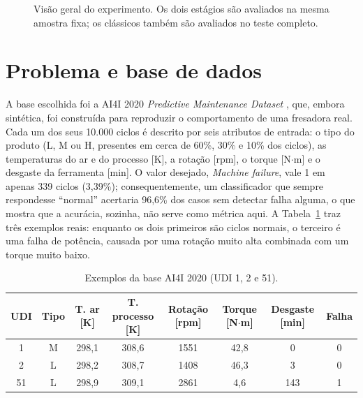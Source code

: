 \documentclass[12pt]{article}
\begin{document}
\begin{figure}[ht]
\caption{Visão geral do experimento. Os dois estágios são avaliados na mesma amostra fixa; os clássicos também são avaliados no teste completo.}
\label{fig:pipeline}
\end{figure}

\section{Problema e base de dados}\label{sec:base}

A base escolhida foi a AI4I 2020 \textit{Predictive Maintenance Dataset} \cite{matzka2020,matzka2020uci}, que, embora sintética, foi construída para reproduzir o comportamento de uma fresadora real. Cada um dos seus 10.000 ciclos é descrito por seis atributos de entrada: o tipo do produto (L, M ou H, presentes em cerca de 60\%, 30\% e 10\% dos ciclos), as temperaturas do ar e do processo [K], a rotação [rpm], o torque [N$\cdot$m] e o desgaste da ferramenta [min]. O valor desejado, \textit{Machine failure}, vale 1 em apenas 339 ciclos (3,39\%); consequentemente, um classificador que sempre respondesse ``normal'' acertaria 96,6\% dos casos sem detectar falha alguma, o que mostra que a acurácia, sozinha, não serve como métrica aqui. A Tabela~\ref{tab:exemplos} traz três exemplos reais: enquanto os dois primeiros são ciclos normais, o terceiro é uma falha de potência, causada por uma rotação muito alta combinada com um torque muito baixo.

\begin{table}[ht]
\centering
\caption{Exemplos da base AI4I 2020 (UDI 1, 2 e 51).}
\label{tab:exemplos}
\small\setlength{\tabcolsep}{3.5pt}
\begin{tabular}{cccccccc}
\toprule
UDI & Tipo & T. ar [K] & T. processo [K] & Rotação [rpm] & Torque [N$\cdot$m] & Desgaste [min] & Falha \\
\midrule
1  & M & 298,1 & 308,6 & 1551 & 42,8 & 0   & 0 \\
2  & L & 298,2 & 308,7 & 1408 & 46,3 & 3   & 0 \\
51 & L & 298,9 & 309,1 & 2861 & 4,6  & 143 & 1 \\
\bottomrule
\end{tabular}
\end{table}
\end{document}

